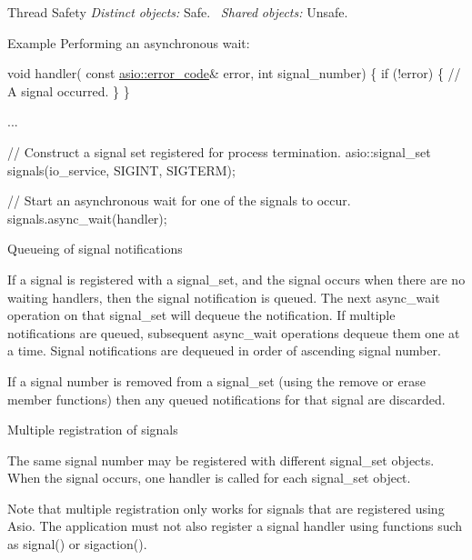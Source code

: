 \begin{DoxyParagraph}{Thread Safety}
{\itshape Distinct} {\itshape objects\+:} Safe.~\newline
{\itshape Shared} {\itshape objects\+:} Unsafe.
\end{DoxyParagraph}
\begin{DoxyParagraph}{Example}
Performing an asynchronous wait\+: 
\begin{DoxyCode}
\textcolor{keywordtype}{void} handler(
    \textcolor{keyword}{const} \hyperlink{classasio_1_1error__code}{asio::error\_code}& error,
    \textcolor{keywordtype}{int} signal\_number)
\{
  \textcolor{keywordflow}{if} (!error)
  \{
    \textcolor{comment}{// A signal occurred.}
  \}
\}

...

\textcolor{comment}{// Construct a signal set registered for process termination.}
asio::signal\_set signals(io\_service, SIGINT, SIGTERM);

\textcolor{comment}{// Start an asynchronous wait for one of the signals to occur.}
signals.async\_wait(handler);
\end{DoxyCode}

\end{DoxyParagraph}
\begin{DoxyParagraph}{Queueing of signal notifications}

\end{DoxyParagraph}
If a signal is registered with a signal\+\_\+set, and the signal occurs when there are no waiting handlers, then the signal notification is queued. The next async\+\_\+wait operation on that signal\+\_\+set will dequeue the notification. If multiple notifications are queued, subsequent async\+\_\+wait operations dequeue them one at a time. Signal notifications are dequeued in order of ascending signal number.

If a signal number is removed from a signal\+\_\+set (using the {\ttfamily remove} or {\ttfamily erase} member functions) then any queued notifications for that signal are discarded.

\begin{DoxyParagraph}{Multiple registration of signals}

\end{DoxyParagraph}
The same signal number may be registered with different signal\+\_\+set objects. When the signal occurs, one handler is called for each signal\+\_\+set object.

Note that multiple registration only works for signals that are registered using Asio. The application must not also register a signal handler using functions such as {\ttfamily signal()} or {\ttfamily sigaction()}.

